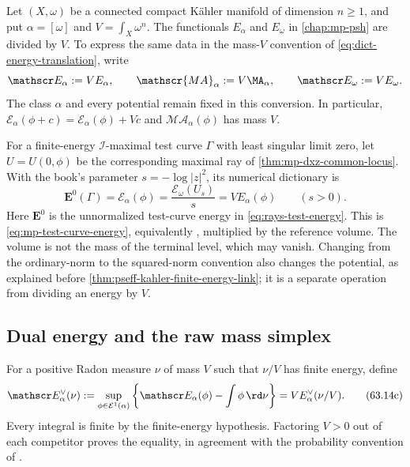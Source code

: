Let $(X,\omega)$ be a connected compact K\"ahler manifold of dimension $n\geq1$, and put $\alpha=[\omega]$ and $V=\int_X\omega^n$. The functionals $E_\alpha$ and $E_\omega$ in \cref{chap:mp-psh} are divided by $V$. To express the same data in the mass-$V$ convention of \eqref{eq:dict-energy-translation}, write
\[
 \mathscr E_\alpha:=VE_\alpha,\qquad
 \mathscr{MA}_\alpha:=V\MA_\alpha,\qquad
 \mathscr E_\omega:=VE_\omega.
\]
The class $\alpha$ and every potential remain fixed in this conversion. In particular, $\mathscr E_\alpha(\phi+c)=\mathscr E_\alpha(\phi)+Vc$ and $\mathscr{MA}_\alpha(\phi)$ has mass $V$.

For a finite-energy $\mathcal I$-maximal test curve $\Gamma$ with least singular limit zero, let $U=U(0,\phi)$ be the corresponding maximal ray of \cref{thm:mp-dxz-common-locus}. With the book's parameter $s=-\log|z|^2$, its numerical dictionary is
\[
 \mathbf E^0(\Gamma)=\mathscr E_\alpha(\phi)
       =\frac{\mathscr E_\omega(U_s)}s
       =V E_\alpha(\phi)\qquad(s>0).
\tag{63.14b}\label{eq:dict-raw-radial-energy}
\]
Here $\mathbf E^0$ is the unnormalized test-curve energy in \eqref{eq:rays-test-energy}. This is \eqref{eq:mp-test-curve-energy}, equivalently \cite[Theorem~2.6(iii), equation~(34)]{DXZ23}, multiplied by the reference volume. The volume is not the mass of the terminal level, which may vanish. Changing from the ordinary-norm to the squared-norm convention also changes the potential, as explained before \cref{thm:pseff-kahler-finite-energy-link}; it is a separate operation from dividing an energy by $V$.

\subsection{Dual energy and the raw mass simplex}
\label{subsec:dict-raw-duality}

For a positive Radon measure $\nu$ of mass $V$ such that $\nu/V$ has finite energy, define
\[
 \mathscr E_\alpha^\vee(\nu)
  :=\sup_{\phi\in\mathcal E^1(\alpha)}
       \left\{\mathscr E_\alpha(\phi)-\int\phi\,\rd\nu\right\}
  =V E_\alpha^\vee(\nu/V).
\tag{63.14c}\label{eq:dict-raw-dual-energy}
\]
Every integral is finite by the finite-energy hypothesis. Factoring $V>0$ out of each competitor proves the equality, in agreement with the probability convention of \cite[Section~2.3.2, p.~12]{MPWN25}.


